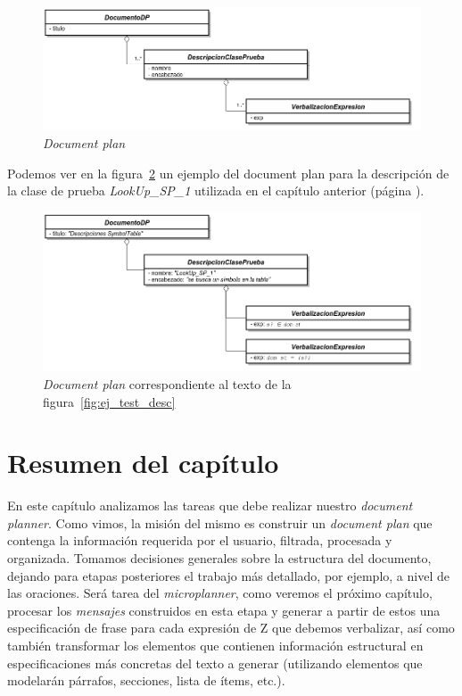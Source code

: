 \begin{figure}[H]
  	\centering
	\includegraphics[scale=0.4]{img/document_plan.png}
	\caption{\textit{Document plan}}
  	\label{fig:png_document_plan}
\end{figure}

Podemos ver en la figura~\ref{fig:png_document_plan_ej} un ejemplo del document plan para la descripción de la clase de prueba \emph{LookUp\_SP\_1} utilizada en el capítulo anterior (página \pageref{fig:ej_test_desc}). 

\begin{figure}[H]
  	\centering
	\includegraphics[scale=0.4]{img/document_plan_ej.png}
	\caption{\textit{Document plan} correspondiente al texto de la figura~\ref{fig:ej_test_desc}}
  	\label{fig:png_document_plan_ej}
\end{figure}

\section{Resumen del capítulo}
En este capítulo analizamos las tareas que debe realizar nuestro \emph{document planner}. Como vimos, la misión del mismo es construir un \emph{document plan} que contenga la información requerida por el usuario, filtrada, procesada y organizada. Tomamos decisiones generales sobre la estructura del documento, dejando para etapas posteriores el trabajo más detallado, por ejemplo, a nivel de las oraciones. Será tarea del \emph{microplanner}, como veremos el próximo capítulo, procesar los \emph{mensajes} construidos en esta etapa y generar a partir de estos una especificación de frase para cada expresión de Z que debemos verbalizar, así como también transformar los elementos que contienen información estructural en especificaciones más concretas del texto a generar (utilizando elementos que modelarán párrafos, secciones, lista de ítems, etc.).
